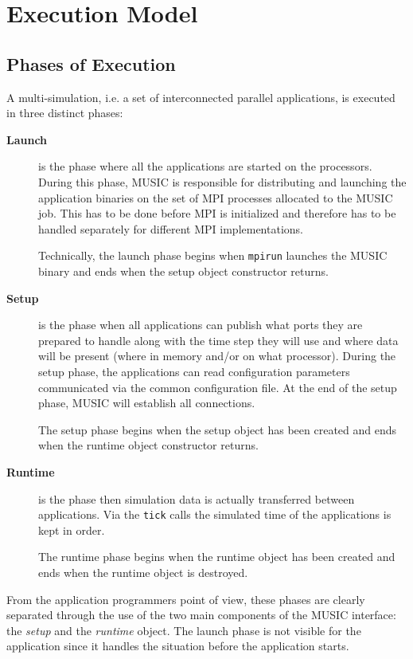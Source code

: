 \documentclass[a4paper]{report}
\begin{document}
\chapter{Execution Model}

\section{Phases of Execution}

A multi-simulation, i.e. a set of interconnected parallel
applications, is executed in three distinct phases:
\begin{description}
\item[\textbf{Launch}] is the phase where all the
  applications are started on the processors.  During this phase,
  MUSIC is responsible for distributing and launching the application
  binaries on the set of MPI processes allocated to the MUSIC job.
  This has to be done before MPI is initialized and therefore has to
  be handled separately for different MPI implementations.

  Technically, the launch phase begins when \texttt{mpirun} launches
  the MUSIC binary and ends when the setup object constructor returns.

\item[\textbf{Setup}] is the phase when all
  applications can publish what ports they are prepared to handle
  along with the time step they will use and where data will be
  present (where in memory and/or on what processor).  During the
  setup phase, the applications can read configuration parameters
  communicated via the common configuration file.  At the end of the
  setup phase, MUSIC will establish all connections.

  The setup phase begins when the setup object has been created and
  ends when the runtime object constructor returns.

\item[\textbf{Runtime}] is the phase then
  simulation data is actually transferred between applications.  Via
  the \texttt{tick} calls the simulated time of the applications is
  kept in order.

  The runtime phase begins when the runtime object has been created
  and ends when the runtime object is destroyed.
\end{description}

From the application programmers point of view, these phases are
clearly separated through the use of the two main components of the
MUSIC interface: the \emph{setup} and the \emph{runtime} object.  The
launch phase is not visible for the application since it handles the
situation before the application starts.
\end{document}
